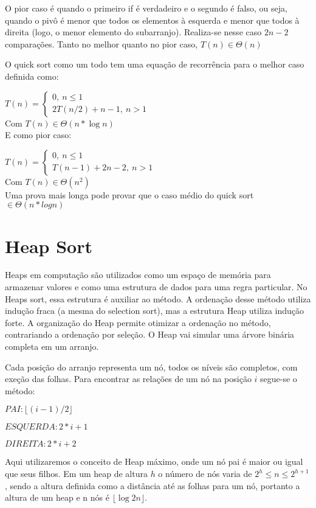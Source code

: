 \documentclass[a4paper, twocolumn]{article}
\theoremstyle{definition}
\begin{document}
O pior caso é quando o primeiro if é verdadeiro e o segundo é falso, ou seja, quando o pivô é menor que todos os elementos à esquerda e menor que todos à direita (logo, o menor elemento do subarranjo). Realiza-se nesse caso $2n-2$ comparações. Tanto no melhor quanto no pior caso, $T(n) \in \Theta(n)$

O quick sort como um todo tem uma equação de recorrência para o melhor caso definida como:

$T(n) = \begin{cases} 
	0, \ n \leq 1\\
	2T(n/2) + n-1, \ n > 1
\end{cases}$ \\
Com $T(n) \in \Theta(n* \log n)$ \\

E como pior caso:

$T(n) = \begin{cases} 
	0, \ n \leq 1\\
	T(n-1) + 2n-2, \ n > 1
\end{cases}$ \\
Com $T(n) \in \Theta(n^2)$\\

Uma prova mais longa pode provar que o caso médio do quick sort $\in \Theta(n* log n)$

\section{Heap Sort}
Heaps em computação são utilizados como um espaço de memória para armazenar valores e como uma estrutura de dados para uma regra particular. No Heaps sort, essa estrutura é auxiliar ao método. A ordenação desse método utiliza indução fraca (a mesma do selection sort), mas a estrutura Heap utiliza indução forte. A organização do Heap permite otimizar a ordenação no método, contrariando a ordenação por seleção. O Heap vai simular uma árvore binária completa em um arranjo.

Cada posição do arranjo representa um nó, todos os níveis são completos, com exeção das folhas. Para encontrar as relações de um nó na posição $i$ segue-se o método:

$PAI: \lfloor(i-1)/2 \rfloor $

$ESQUERDA: 2*i + 1$

$DIREITA: 2*i + 2 $

Aqui utilizaremos o conceito de Heap máximo, onde um nó pai é maior ou igual que seus filhos. Em um heap de altura $h$ o número de nós varia de $2^h \leq n \leq 2^{h+1}$, sendo a altura definida como a distância até as folhas para um nó, portanto a altura de um heap e n nós é $\lfloor \log2 n \rfloor$.
\end{document}
